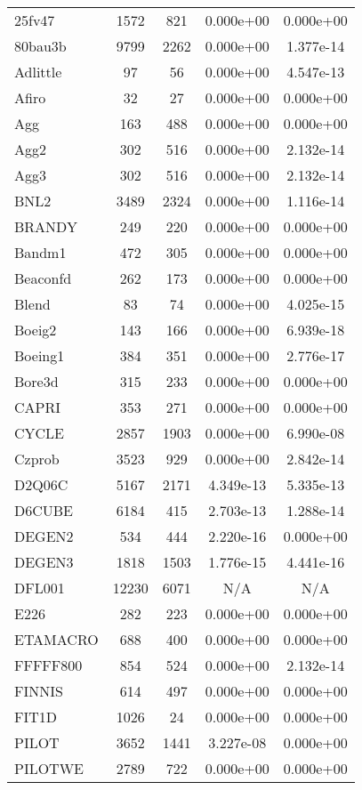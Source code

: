 \documentclass[12pt]{article}
\begin{document}
\begin{longtable}{@{}l|cccc@{}}
\bottomrule
\endlastfoot
25fv47 & 1572 & 821 & 0.000e+00 & 0.000e+00 \\
80bau3b & 9799 & 2262 & 0.000e+00 & 1.377e-14 \\
Adlittle & 97 & 56 & 0.000e+00 & 4.547e-13 \\
Afiro & 32 & 27 & 0.000e+00 & 0.000e+00 \\
Agg & 163 & 488 & 0.000e+00 & 0.000e+00 \\
Agg2 & 302 & 516 & 0.000e+00 & 2.132e-14 \\
Agg3 & 302 & 516 & 0.000e+00 & 2.132e-14 \\
BNL2 & 3489 & 2324 & 0.000e+00 & 1.116e-14 \\
BRANDY & 249 & 220 & 0.000e+00 & 0.000e+00 \\
Bandm1 & 472 & 305 & 0.000e+00 & 0.000e+00 \\
Beaconfd & 262 & 173 & 0.000e+00 & 0.000e+00 \\
Blend & 83 & 74 & 0.000e+00 & 4.025e-15 \\
Boeig2 & 143 & 166 & 0.000e+00 & 6.939e-18 \\
Boeing1 & 384 & 351 & 0.000e+00 & 2.776e-17 \\
Bore3d & 315 & 233 & 0.000e+00 & 0.000e+00 \\
CAPRI & 353 & 271 & 0.000e+00 & 0.000e+00 \\
CYCLE & 2857 & 1903 & 0.000e+00 & 6.990e-08 \\
Czprob & 3523 & 929 & 0.000e+00 & 2.842e-14 \\
D2Q06C & 5167 & 2171 & 4.349e-13 & 5.335e-13 \\
D6CUBE & 6184 & 415 & 2.703e-13 & 1.288e-14 \\
DEGEN2 & 534 & 444 & 2.220e-16 & 0.000e+00 \\
DEGEN3 & 1818 & 1503 & 1.776e-15 & 4.441e-16 \\
DFL001 & 12230 & 6071 & N/A & N/A \\
E226 & 282 & 223 & 0.000e+00 & 0.000e+00 \\
ETAMACRO & 688 & 400 & 0.000e+00 & 0.000e+00 \\
FFFFF800 & 854 & 524 & 0.000e+00 & 2.132e-14 \\
FINNIS & 614 & 497 & 0.000e+00 & 0.000e+00 \\
FIT1D & 1026 & 24 & 0.000e+00 & 0.000e+00 \\
PILOT & 3652 & 1441 & 3.227e-08 & 0.000e+00 \\
PILOTWE & 2789 & 722 & 0.000e+00 & 0.000e+00 \\

\end{longtable}
\end{document}
